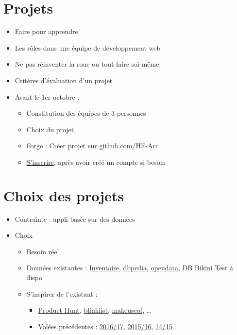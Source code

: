 \hypertarget{projets}{%
\section{Projets}\label{projets}}

\begin{itemize}
\tightlist
\item
  Faire pour apprendre
\item
  Les rôles dans une équipe de développement web
\item
  Ne pas réinventer la roue ou tout faire soi-même
\item
  Critères d'évaluation d'un projet
\item
  Avant le 1er octobre :

  \begin{itemize}
  \tightlist
  \item
    Constitution des équipes de 3 personnes
  \item
    Choix du projet
  \item
    Forge : Créer projet sur
    \href{https://github.com/HE-Arc/}{github.com/HE-Arc}
  \item
    \href{https://projets-labinfo.he-arc.ch/projects/webdev/wiki}{S'inscrire},
    après avoir créé un compte si besoin
  \end{itemize}
\end{itemize}

\hypertarget{choix-des-projets}{%
\section{Choix des projets}\label{choix-des-projets}}

\begin{itemize}
\tightlist
\item
  Contrainte : appli basée sur des données
\item
  Choix

  \begin{itemize}
  \tightlist
  \item
    Besoin réel
  \item
    Données existantes :
    \href{https://inventory.ing.he-arc.ch/}{Inventaire},
    \href{http://wiki.dbpedia.org/}{dbpedia},
    \href{https://opendata.swiss/fr/}{opendata}, DB Bikini Test à dispo
  \item
    S'inspirer de l'existant :

    \begin{itemize}
    \tightlist
    \item
      \href{https://www.producthunt.com/topics/web-app}{Product Hunt},
      \href{http://blinklist.com/reviews}{blinklist},
      \href{http://www.makeuseof.com/tag/best-websites-internet/}{makeuseof},
      \ldots{}
    \item
      Volées précédentes :
      \href{https://github.com/orgs/HE-Arc/teams/webapp-1617/repositories}{2016/17},
      \href{https://projets-labinfo.he-arc.ch/projects/webdev/wiki/Wiki\#Projets-2015-2016}{2015/16},
      \href{https://forge.ing.he-arc.ch/projects/1415-dw/wiki/Wiki}{14/15}
    \end{itemize}
  \end{itemize}
\end{itemize}

